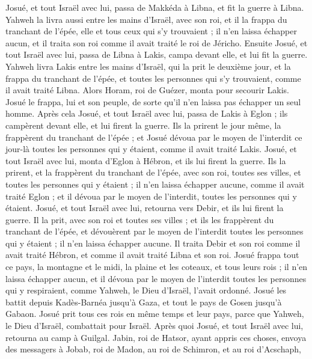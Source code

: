 \begin{multicols}{2}
Josué, et tout Israël avec lui, passa de Makkéda à Libna, et fit la guerre à Libna.
Yahweh la livra aussi entre les mains d’Israël, avec son roi, et il la frappa du tranchant de l’épée, elle et tous ceux qui s’y trouvaient ; il n’en laissa échapper aucun, et il traita son roi comme il avait traité le roi de Jéricho.
Ensuite Josué, et tout Israël avec lui, passa de Libna à Lakis, campa devant elle, et lui fit la guerre.
Yahweh livra Lakis entre les mains d’Israël, qui la prit le deuxième jour, et la frappa du tranchant de l’épée, et toutes les personnes qui s’y trouvaient, comme il avait traité Libna.
Alors Horam, roi de Guézer, monta pour secourir Lakis. Josué le frappa, lui et son peuple, de sorte qu’il n’en laissa pas échapper un seul homme.
Après cela Josué, et tout Israël avec lui, passa de Lakis à Eglon ; ils campèrent devant elle, et lui firent la guerre.
Ils la prirent le jour même, la frappèrent du tranchant de l’épée ; et Josué dévoua par le moyen de l'interdit ce jour-là toutes les personnes qui y étaient, comme il avait traité Lakis.
Josué, et tout Israël avec lui, monta d’Eglon à Hébron, et ils lui firent la guerre.
Ils la prirent, et la frappèrent du tranchant de l’épée, avec son roi, toutes ses villes, et toutes les personnes qui y étaient ; il n’en laissa échapper aucune, comme il avait traité Eglon ; et il dévoua par le moyen de l'interdit, toutes les personnes qui y étaient.
Josué, et tout Israël avec lui, retourna vers Debir, et ils lui firent la guerre.
Il la prit, avec son roi et toutes ses villes ; et ils les frappèrent du tranchant de l’épée, et dévouèrent par le moyen de l'interdit toutes les personnes qui y étaient ; il n’en laissa échapper aucune. Il traita Debir et son roi comme il avait traité Hébron, et comme il avait traité Libna et son roi.
Josué frappa tout ce pays, la montagne et le midi, la plaine et les coteaux, et tous leurs rois ; il n’en laissa échapper aucun, et il dévoua par le moyen de l'interdit toutes les personnes qui y respiraient, comme Yahweh, le Dieu d’Israël, l’avait ordonné.
Josué les battit depuis Kadès-Barnéa jusqu’à Gaza, et tout le pays de Gosen jusqu’à Gabaon.
Josué prit tous ces rois en même temps et leur pays, parce que Yahweh, le Dieu d’Israël, combattait pour Israël.
Après quoi Josué, et tout Israël avec lui, retourna au camp à Guilgal.
\VerseOne{}Jabin, roi de Hatsor, ayant appris ces choses, envoya des messagers à Jobab, roi de Madon, au roi de Schimron, et au roi d’Acschaph,

\end{multicols}
